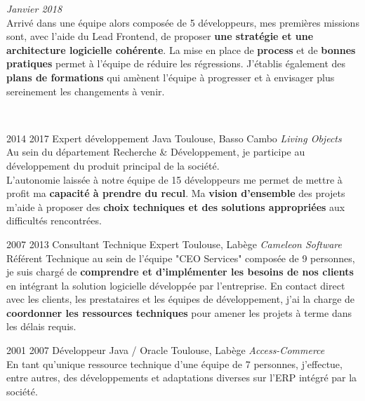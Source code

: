 \documentclass{friggeri-cv} 	%
\begin{document}
\begin{entrylist}
{\begin{description}[leftmargin=0cm]
    \item[\hspace*{-1cm}\bodyfont{|} \normalfont \textbf{\color{orange}Tech \color{headercolor}Lead Backend}] \hfill \textit{Janvier 2018} \\
    Arrivé dans une équipe alors composée de 5 développeurs, mes premières missions sont, avec l’aide du Lead Frontend, de proposer \textbf{une stratégie et une architecture logicielle cohérente}. La mise en place de \textbf{process} et de \textbf{bonnes pratiques} permet à l’équipe de réduire les régressions. J’établis également des \textbf{plans de formations} qui amènent l’équipe à progresser et à envisager plus sereinement les changements à venir.
\end{description}
\
}

\entry
{2014  2017}
{Expert développement Java}
{Toulouse, Basso Cambo}
{\vspace{0.2cm}\emph{Living Objects} \\
Au sein du département Recherche \& Développement, je participe au développement du produit principal de la société.\\
L’autonomie laissée à notre équipe de 15 développeurs me permet de mettre à profit ma \textbf{capacité à prendre du recul}. Ma \textbf{vision d’ensemble} des projets m’aide à proposer des \textbf{choix techniques et des solutions appropriées} aux difficultés rencontrées.
\\}
\end{entrylist}
\begin{entrylist}
\entry
{2007  2013}
{Consultant Technique Expert}
{Toulouse, Labège}
{\vspace{0.2cm}\emph{Cameleon Software} \\
Référent Technique au sein de l’équipe "CEO Services" composée de 9 personnes, je suis chargé de \textbf{comprendre et d’implémenter les besoins de nos clients} en intégrant la solution logicielle développée par l’entreprise. En contact direct avec les clients, les prestataires et les équipes de développement, j’ai la charge de \textbf{coordonner les ressources techniques} pour amener les projets à terme dans les délais requis.
\
}

\entry
{2001 \ding{224} 2007}
{Développeur Java / Oracle}
{Toulouse, Labège}
{\vspace{0.2cm}\emph{Access-Commerce}  \\
En tant qu’unique ressource technique d’une équipe de 7 personnes, j’effectue, entre autres, des développements et adaptations diverses sur l’ERP intégré par la société.
}
\end{entrylist}
\end{document}
